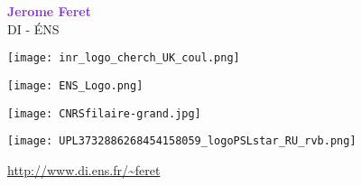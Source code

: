 \documentclass[landscape,20pt]{transparents2e}
\newcommand{\red}{\textcolor{red}}
\newcommand{\blue}{\textcolor{BlueViolet}}
\begin{document}
\begin{slide}{}
\thispagestyle{empty}
\newcommand{\Hrule}{\rule{\linewidth}{1mm}}

\vspace*{-2.1cm}

\begin{center}
{\bf \Huge{\confname}} \bigskip\\
\end{center}

\vspace*{0.2cm}

\begin{center}
{\bf{\red{}}} \bigskip\\
\end{center}

\vspace*{0.2cm}

\begin{center}
{\blue {{\Huge \bf Jerome Feret}}}  \smallskip\\
\huge{DI - \'ENS \bigskip}
\end{center}

\vspace*{0.2cm}

\begin{center}
\begin{minipage}{\linewidth}
\hfill\hfill
\begin{minipage}{0.08\linewidth}
\texttt{[image: inr\_logo\_cherch\_UK\_coul.png]}
\end{minipage}\hfill
\begin{minipage}{0.08\linewidth}
  \texttt{[image: ENS\_Logo.png]}
\end{minipage}\hfill
\begin{minipage}{0.08\linewidth}
\texttt{[image: CNRSfilaire-grand.jpg]}
\end{minipage}\hfill
\begin{minipage}{0.1\linewidth}
  \texttt{[image: UPL3732886268454158059\_logoPSLstar\_RU\_rvb.png]}
\end{minipage}\hfill\hfill\mbox{}
\end{minipage}
\end{center}


\vspace*{0.4cm}

\begin{center}
\red{\url{http://www.di.ens.fr/~feret}}
\end{center}



\end{slide}
\end{document}

